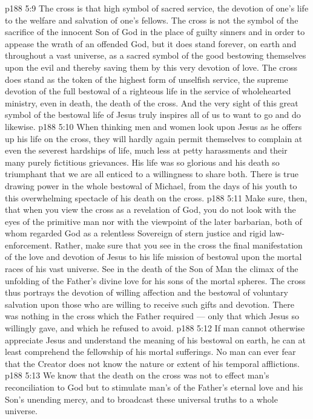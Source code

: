 \vs p188 5:9 \pc The cross is that high symbol of sacred service, the devotion of one’s life to the welfare and salvation of one’s fellows. The cross is not the symbol of the sacrifice of the innocent Son of God in the place of guilty sinners and in order to appease the wrath of an offended God, but it does stand forever, on earth and throughout a vast universe, as a sacred symbol of the good bestowing themselves upon the evil and thereby saving them by this very devotion of love. The cross does stand as the token of the highest form of unselfish service, the supreme devotion of the full bestowal of a righteous life in the service of wholehearted ministry, even in death, the death of the cross. And the very sight of this great symbol of the bestowal life of Jesus truly inspires all of us to want to go and do likewise.
\vs p188 5:10 When thinking men and women look upon Jesus as he offers up his life on the cross, they will hardly again permit themselves to complain at even the severest hardships of life, much less at petty harassments and their many purely fictitious grievances. His life was so glorious and his death so triumphant that we are all enticed to a willingness to share both. There is true drawing power in the whole bestowal of Michael, from the days of his youth to this overwhelming spectacle of his death on the cross.
\vs p188 5:11 Make sure, then, that when you view the cross as a revelation of God, you do not look with the eyes of the primitive man nor with the viewpoint of the later barbarian, both of whom regarded God as a relentless Sovereign of stern justice and rigid law\hyp{}enforcement. Rather, make sure that you see in the cross the final manifestation of the love and devotion of Jesus to his life mission of bestowal upon the mortal races of his vast universe. See in the death of the Son of Man the climax of the unfolding of the Father’s divine love for his sons of the mortal spheres. The cross thus portrays the devotion of willing affection and the bestowal of voluntary salvation upon those who are willing to receive such gifts and devotion. There was nothing in the cross which the Father required --- only that which Jesus so willingly gave, and which he refused to avoid.
\vs p188 5:12 \pc If man cannot otherwise appreciate Jesus and understand the meaning of his bestowal on earth, he can at least comprehend the fellowship of his mortal sufferings. No man can ever fear that the Creator does not know the nature or extent of his temporal afflictions.
\vs p188 5:13 We know that the death on the cross was not to effect man’s reconciliation to God but to stimulate man’s  of the Father’s eternal love and his Son’s unending mercy, and to broadcast these universal truths to a whole universe.
\quizlink

